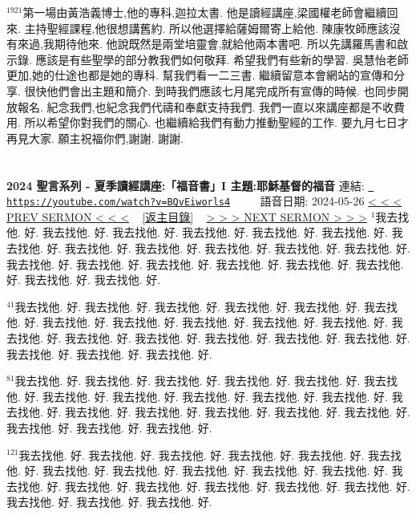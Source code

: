\documentclass{book}
\begin{document}
$^{1921}$第一場由黃浩義博士,他的專科,迦拉太書.
他是讀經講座,梁國權老師會繼續回來.
主持聖經課程,他很想講舊約.
所以他選擇給薩姆爾寄上給他.
陳康牧師應該沒有來過,我期待他來.
他說既然是兩堂培靈會,就給他兩本書吧.
所以先講羅馬書和啟示錄.
應該是有些聖學的部分教我們如何敬拜.
希望我們有些新的學習.
吳慧怡老師更加,她的仕途也都是她的專科.
幫我們看一二三書.
繼續留意本會網站的宣傳和分享.
很快他們會出主題和簡介.
到時我們應該七月尾完成所有宣傳的時候.
也同步開放報名.
紀念我們,也紀念我們代禱和奉獻支持我們.
我們一直以來講座都是不收費用.
所以希望你對我們的關心.
也繼續給我們有動力推動聖經的工作.
要九月七日才再見大家.
願主祝福你們,謝謝.
謝謝.
\newpage



\section{}
\label{sec:BQvEiworls4}
\textbf{2024 聖言系列 - 夏季讀經講座:「福音書」I 主題:耶穌基督的福音}
\newline
\newline
連結: \href{https://youtube.com/watch?v=BQvEiworls4}{\texttt{ https://youtube.com/watch?v=BQvEiworls4}} ~~~~ 語音日期: 2024-05-26 
\newline
\newline
\hyperref[sec:evqz1q_hC_A]{\small{< < < PREV SERMON < < <}}
~
\hyperref[sec:index]{\small{[返主目錄]}}
~
\hyperref[sec:FsXNMWFwxHg]{\small{> > > NEXT SERMON > > >}}
\newline
\newline
$^{1}$我去找他.
好.
我去找他.
好.
我去找他.
好.
我去找他.
好.
我去找他.
好.
我去找他.
好.
我去找他.
好.
我去找他.
好.
我去找他.
好.
我去找他.
好.
我去找他.
好.
我去找他.
好.
我去找他.
好.
我去找他.
好.
我去找他.
好.
我去找他.
好.
我去找他.
好.
我去找他.
好.
我去找他.
好.
我去找他.
好.

$^{41}$我去找他.
好.
我去找他.
好.
我去找他.
好.
我去找他.
好.
我去找他.
好.
我去找他.
好.
我去找他.
好.
我去找他.
好.
我去找他.
好.
我去找他.
好.
我去找他.
好.
我去找他.
好.
我去找他.
好.
我去找他.
好.
我去找他.
好.
我去找他.
好.
我去找他.
好.
我去找他.
好.
我去找他.
好.
我去找他.
好.

$^{81}$我去找他.
好.
我去找他.
好.
我去找他.
好.
我去找他.
好.
我去找他.
好.
我去找他.
好.
我去找他.
好.
我去找他.
好.
我去找他.
好.
我去找他.
好.
我去找他.
好.
我去找他.
好.
我去找他.
好.
我去找他.
好.
我去找他.
好.
我去找他.
好.
我去找他.
好.
我去找他.
好.
我去找他.
好.
我去找他.
好.

$^{121}$我去找他.
好.
我去找他.
好.
我去找他.
好.
我去找他.
好.
我去找他.
好.
我去找他.
好.
我去找他.
好.
我去找他.
好.
我去找他.
好.
我去找他.
好.
我去找他.
好.
我去找他.
好.
我去找他.
好.
我去找他.
好.
我去找他.
好.
我去找他.
好.
我去找他.
好.
我去找他.
好.
我去找他.
好.
我去找他.
好.
\end{document}

